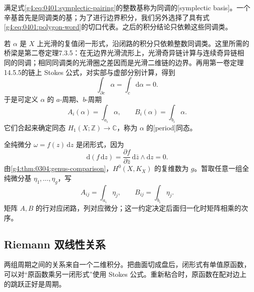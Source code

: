 满足式\eqref{g4:eq:0401:symplectic-pairing}的整数基称为同调的[symplectic basis]。一个辛基首先是同调类的基；为了进行边界积分，我们另外选择了具有式\eqref{g4:eq:0401:polygon-word}的切口代表。之后的积分结论只依赖这些同调类。

\ProseParagraphBreak

若 \(\alpha\) 是 \(X\) 上光滑的复值闭一形式，沿闭路的积分只依赖整数同调类。这里所需的桥梁是第二卷定理7.3.5：在无边界光滑流形上，光滑奇异链计算与连续奇异链相同的同调；相同同调类的光滑圈之差因而是光滑二维链的边界。再用第一卷定理14.5.5的链上 Stokes 公式，对实部与虚部分别计算，得到
\[
	\int_{\partial c}\alpha=\int_c\mathrm{d}\alpha=0.
\]
于是可定义 \(\alpha\) 的 \(a\)-周期、\(b\)-周期
\[
	A_i(\alpha)=\int_{a_i}\alpha,
	\qquad B_i(\alpha)=\int_{b_i}\alpha.
\]
它们合起来确定同态 \(H_1(X;\mathbb Z)\to\mathbb C\)，称为 \(\alpha\) 的[period]同态。

\ProseParagraphBreak

全纯微分 \(\omega=f(z)\,\mathrm{d}z\) 是闭形式，因为
\[
	\mathrm{d}(f\,\mathrm{d}z)
	=\frac{\partial f}{\partial\bar z}\,\mathrm{d}\bar z\wedge\mathrm{d}z=0.
\]
由\cref{g4:thm:0304:genus-comparison}，\(H^0(X,K_X)\) 的复维数为 \(g\)。暂取任意一组全纯微分基 \(\eta_1,\ldots,\eta_g\)，写
\[
	A_{ij}=\int_{a_i}\eta_j,
	\qquad B_{ij}=\int_{b_i}\eta_j.
\]
矩阵 \(A,B\) 的行对应闭路，列对应微分；这一约定决定后面归一化时矩阵相乘的次序。

\subsection{Riemann 双线性关系}
\label{g4:subsec:0401:02}

两组周期之间的关系来自一个二维积分。把曲面切成盘后，闭形式有单值原函数，可以对“原函数乘另一闭形式”使用 Stokes 公式。重新粘合时，原函数在配对边上的跳跃正好是周期。

